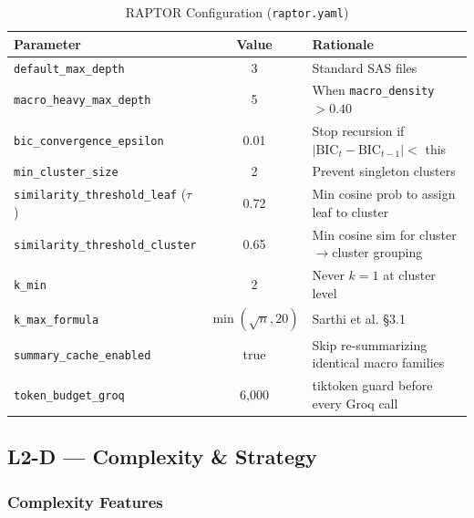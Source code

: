 \documentclass[11pt,a4paper]{article}
\begin{document}
\begin{table}[H]
\centering
\caption{RAPTOR Configuration (\texttt{raptor.yaml})}
\renewcommand{\arraystretch}{1.25}
\begin{tabularx}{\textwidth}{@{} l c X @{}}
\toprule
\textbf{Parameter} & \textbf{Value} & \textbf{Rationale} \\
\midrule
\texttt{default\_max\_depth} & 3 & Standard SAS files \\
\texttt{macro\_heavy\_max\_depth} & 5 & When \texttt{macro\_density} $> 0.40$ \\
\texttt{bic\_convergence\_epsilon} & 0.01 & Stop recursion if $|\text{BIC}_t - \text{BIC}_{t-1}| <$ this \\
\texttt{min\_cluster\_size} & 2 & Prevent singleton clusters \\
\texttt{similarity\_threshold\_leaf} ($\tau$) & 0.72 & Min cosine prob to assign leaf to cluster \\
\texttt{similarity\_threshold\_cluster} & 0.65 & Min cosine sim for cluster$\to$cluster grouping \\
\texttt{k\_min} & 2 & Never $k{=}1$ at cluster level \\
\texttt{k\_max\_formula} & $\min(\sqrt{n}, 20)$ & Sarthi et al. \S3.1 \\
\texttt{summary\_cache\_enabled} & true & Skip re-summarizing identical macro families \\
\texttt{token\_budget\_groq} & 6,000 & tiktoken guard before every Groq call \\
\bottomrule
\end{tabularx}
\end{table}

\subsection{L2-D — Complexity \& Strategy}

\subsubsection{Complexity Features}
\end{document}
